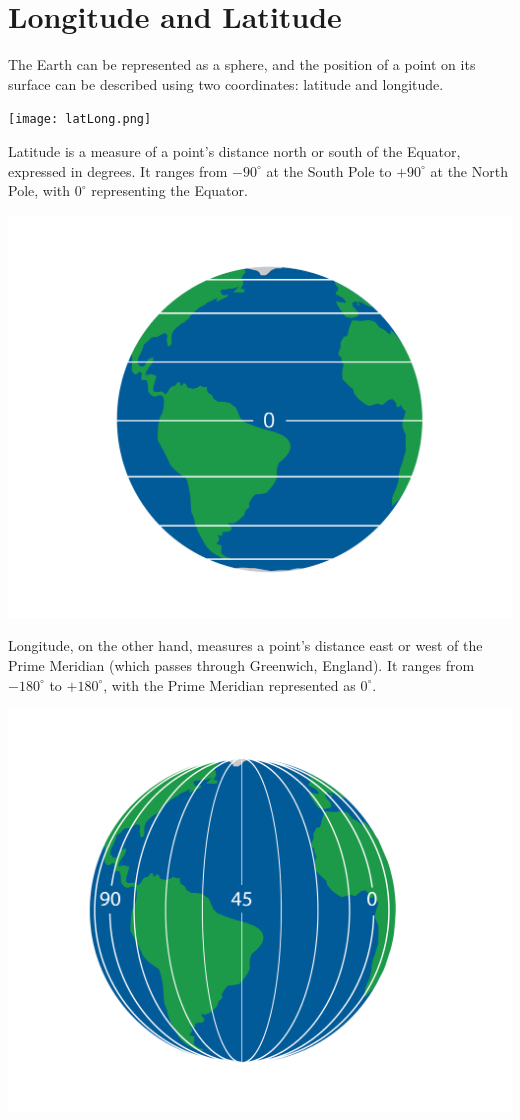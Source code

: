 \chapter{Longitude and Latitude}


The Earth can be represented as a sphere, and the position of a point
on its surface can be described using two coordinates: latitude and
longitude. 

\texttt{[image: latLong.png]}


Latitude is a measure of a point's distance north or south of the
Equator, expressed in degrees. It ranges from $-90^{\circ}$ at the
South Pole to $+90^{\circ}$ at the North Pole, with $0^{\circ}$
representing the Equator.

\includegraphics[width=\textwidth]{lat.png}

Longitude, on the other hand, measures a point's distance east or west
of the Prime Meridian (which passes through Greenwich, England). It
ranges from $-180^{\circ}$ to $+180^{\circ}$, with the Prime Meridian
represented as $0^{\circ}$.

\includegraphics[width=\textwidth]{long.png}


